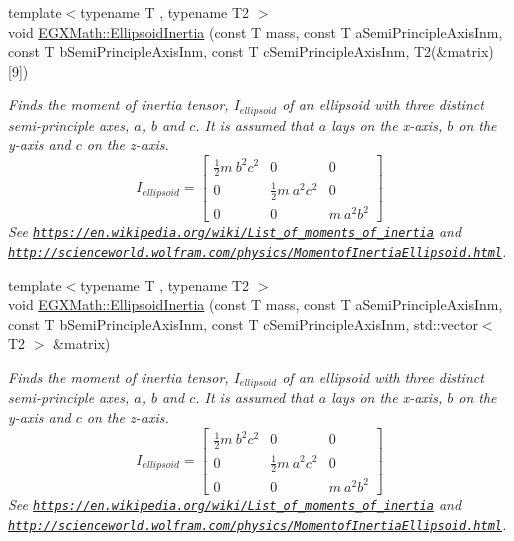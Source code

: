 \begin{DoxyCompactItemize}
\item 
{\footnotesize template$<$typename T , typename T2 $>$ }\\void \mbox{\hyperlink{group___e_g_x_math-_geometry-3_d-_ellipsoid-_inertia_ga3b6f641f06037be75b8f51822eaa71bf}{E\+G\+X\+Math\+::\+Ellipsoid\+Inertia}} (const T mass, const T a\+Semi\+Principle\+Axis\+Inm, const T b\+Semi\+Principle\+Axis\+Inm, const T c\+Semi\+Principle\+Axis\+Inm, T2(\&matrix)\mbox{[}9\mbox{]})
\begin{DoxyCompactList}\small\item\em Finds the moment of inertia tensor, $I_{ellipsoid}$ of an ellipsoid with three distinct semi-\/principle axes, $a$, $b$ and $c$. It is assumed that $a$ lays on the x-\/axis, $b$ on the y-\/axis and $c$ on the z-\/axis. \[ I_{ellipsoid}=\begin{bmatrix} \frac{1}{2}m\ b^2c^2 & 0 & 0\\ 0 & \frac{1}{2}m\ a^2c^2 & 0\\ 0 & 0 & m\ a^2b^2 \end{bmatrix} \] See \href{https://en.wikipedia.org/wiki/List_of_moments_of_inertia}{\tt https\+://en.\+wikipedia.\+org/wiki/\+List\+\_\+of\+\_\+moments\+\_\+of\+\_\+inertia} and \href{http://scienceworld.wolfram.com/physics/MomentofInertiaEllipsoid.html}{\tt http\+://scienceworld.\+wolfram.\+com/physics/\+Momentof\+Inertia\+Ellipsoid.\+html}. \end{DoxyCompactList}\item 
{\footnotesize template$<$typename T , typename T2 $>$ }\\void \mbox{\hyperlink{group___e_g_x_math-_geometry-3_d-_ellipsoid-_inertia_ga05dee023c58e7615d16e431bf5a99609}{E\+G\+X\+Math\+::\+Ellipsoid\+Inertia}} (const T mass, const T a\+Semi\+Principle\+Axis\+Inm, const T b\+Semi\+Principle\+Axis\+Inm, const T c\+Semi\+Principle\+Axis\+Inm, std\+::vector$<$ T2 $>$ \&matrix)
\begin{DoxyCompactList}\small\item\em Finds the moment of inertia tensor, $I_{ellipsoid}$ of an ellipsoid with three distinct semi-\/principle axes, $a$, $b$ and $c$. It is assumed that $a$ lays on the x-\/axis, $b$ on the y-\/axis and $c$ on the z-\/axis. \[ I_{ellipsoid}=\begin{bmatrix} \frac{1}{2}m\ b^2c^2 & 0 & 0\\ 0 & \frac{1}{2}m\ a^2c^2 & 0\\ 0 & 0 & m\ a^2b^2 \end{bmatrix} \] See \href{https://en.wikipedia.org/wiki/List_of_moments_of_inertia}{\tt https\+://en.\+wikipedia.\+org/wiki/\+List\+\_\+of\+\_\+moments\+\_\+of\+\_\+inertia} and \href{http://scienceworld.wolfram.com/physics/MomentofInertiaEllipsoid.html}{\tt http\+://scienceworld.\+wolfram.\+com/physics/\+Momentof\+Inertia\+Ellipsoid.\+html}. \end{DoxyCompactList}\item 

\end{DoxyCompactItemize}
